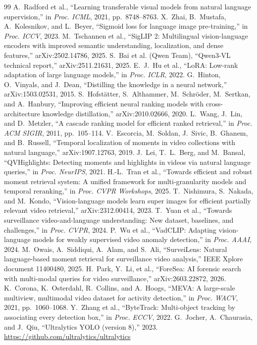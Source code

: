 \documentclass[11pt,a4paper]{article}
\begin{document}
\begin{thebibliography}{99}\small
{} A.~Radford et al., ``Learning transferable visual models from natural language supervision,'' in \emph{Proc. ICML}, 2021, pp.~8748--8763.
 X.~Zhai, B.~Mustafa, A.~Kolesnikov, and L.~Beyer, ``Sigmoid loss for language image pre-training,'' in \emph{Proc. ICCV}, 2023.
 M.~Tschannen et al., ``SigLIP 2: Multilingual vision-language encoders with improved semantic understanding, localization, and dense features,'' arXiv:2502.14786, 2025.
 S.~Bai et al. (Qwen Team), ``Qwen3-VL technical report,'' arXiv:2511.21631, 2025.
 E.~J.~Hu et al., ``LoRA: Low-rank adaptation of large language models,'' in \emph{Proc. ICLR}, 2022.
 G.~Hinton, O.~Vinyals, and J.~Dean, ``Distilling the knowledge in a neural network,'' arXiv:1503.02531, 2015.
 S.~Hofst\"atter, S.~Althammer, M.~Schr\"oder, M.~Sertkan, and A.~Hanbury, ``Improving efficient neural ranking models with cross-architecture knowledge distillation,'' arXiv:2010.02666, 2020.
 L.~Wang, J.~Lin, and D.~Metzler, ``A cascade ranking model for efficient ranked retrieval,'' in \emph{Proc. ACM SIGIR}, 2011, pp.~105--114.
 V.~Escorcia, M.~Soldan, J.~Sivic, B.~Ghanem, and B.~Russell, ``Temporal localization of moments in video collections with natural language,'' arXiv:1907.12763, 2019.
 J.~Lei, T.~L.~Berg, and M.~Bansal, ``QVHighlights: Detecting moments and highlights in videos via natural language queries,'' in \emph{Proc. NeurIPS}, 2021.
 H.-L.~Tran et al., ``Towards efficient and robust moment retrieval system: A unified framework for multi-granularity models and temporal reranking,'' in \emph{Proc. CVPR Workshops}, 2025.
 T.~Nishimura, S.~Nakada, and M.~Kondo, ``Vision-language models learn super images for efficient partially relevant video retrieval,'' arXiv:2312.00414, 2023.
 T.~Yuan et al., ``Towards surveillance video-and-language understanding: New dataset, baselines, and challenges,'' in \emph{Proc. CVPR}, 2024.
 P.~Wu et al., ``VadCLIP: Adapting vision-language models for weakly supervised video anomaly detection,'' in \emph{Proc. AAAI}, 2024.
 M.~Owais, A.~Siddiqui, A.~Alam, and S.~Ali, ``SurveiLens: Natural language-based moment retrieval for surveillance video analysis,'' IEEE Xplore document 11400480, 2025.
 H.~Park, Y.~Li, et al., ``ForeSea: AI forensic search with multi-modal queries for video surveillance,'' arXiv:2603.22872, 2026.
 K.~Corona, K.~Osterdahl, R.~Collins, and A.~Hoogs, ``MEVA: A large-scale multiview, multimodal video dataset for activity detection,'' in \emph{Proc. WACV}, 2021, pp.~1060--1068.
 Y.~Zhang et al., ``ByteTrack: Multi-object tracking by associating every detection box,'' in \emph{Proc. ECCV}, 2022.
 G.~Jocher, A.~Chaurasia, and J.~Qiu, ``Ultralytics YOLO (version 8),'' 2023. \url{https://github.com/ultralytics/ultralytics}
\end{thebibliography}
\end{document}
